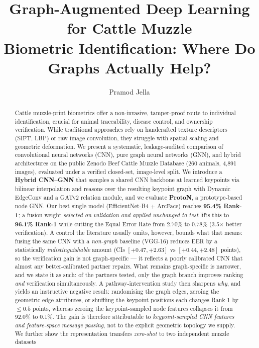 \documentclass[11pt]{article}
\title{\textbf{Graph-Augmented Deep Learning for Cattle Muzzle\\ Biometric Identification: Where Do Graphs Actually Help?}}
\author[1]{Pramod Jella}
\affil[1]{\small Independent Research}
\date{}
\begin{document}
\maketitle

\begin{abstract}
\noindent
Cattle muzzle-print biometrics offer a non-invasive, tamper-proof route to individual
identification, crucial for animal traceability, disease control, and ownership
verification. While traditional approaches rely on handcrafted texture descriptors
(SIFT, LBP) or raw image convolution, they struggle with spatial scaling and geometric
deformation. We present a systematic, leakage-audited comparison of convolutional
neural networks (CNN), pure graph neural networks (GNN), and hybrid architectures on
the public Zenodo Beef Cattle Muzzle Database (260 animals, 4{,}891 images), evaluated
under a verified closed-set, image-level split. We introduce a \textbf{Hybrid CNN--GNN}
that samples a shared CNN backbone at learned keypoints via bilinear interpolation and
reasons over the resulting keypoint graph with Dynamic EdgeConv and a GATv2 relation
module, and we evaluate \textbf{ProtoN}, a prototype-based node GNN. Our best single
model (EfficientNet-B4 + ArcFace) reaches \textbf{95.4\% Rank-1}; a fusion weight
\emph{selected on validation and applied unchanged to test} lifts this to
\textbf{96.1\% Rank-1} while cutting the Equal Error Rate from 2.70\% to 0.78\%
(3.5$\times$ better verification). A control the literature usually omits, however, bounds what that means: fusing the same CNN with a \emph{non-graph} baseline (VGG-16) reduces EER by a statistically \emph{indistinguishable} amount (CIs $[+0.47,+2.63]$ vs $[+0.44,+2.48]$ points), so the verification gain is not graph-specific --- it reflects a poorly calibrated CNN that almost any better-calibrated partner repairs. What remains graph-specific is narrower, and we state it as such: of the partners tested, only the graph branch improves ranking \emph{and} verification simultaneously. A pathway-intervention study then sharpens
\emph{why}, and yields an instructive negative result: randomising the graph edges, zeroing
the geometric edge attributes, or shuffling the keypoint positions each changes Rank-1 by
$\le0.5$ points, whereas zeroing the keypoint-sampled node features collapses it from
92.0\% to 0.1\%. The gain is therefore attributable to \emph{keypoint-sampled CNN features
and feature-space message passing}, not to the explicit geometric topology we supply.
We further show the
representation transfers \emph{zero-shot} to two independent muzzle datasets

\end{abstract}
\end{document}
